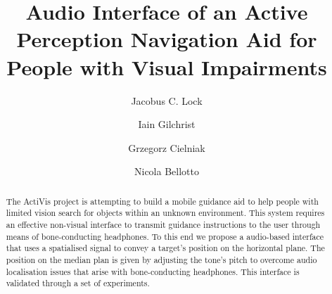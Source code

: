\documentclass{llncs}
\begin{document}
\title{Audio Interface of an Active Perception Navigation Aid for People with Visual Impairments}

\author{Jacobus C. Lock \and 
Iain Gilchrist \and
Grzegorz Cielniak \and
Nicola Bellotto}



\maketitle
\setcounter{footnote}{0}

\begin{abstract}
  The ActiVis project is attempting to build a mobile guidance aid to help people with limited vision search for objects within an unknown environment.
  This system requires an effective non-visual interface to transmit guidance instructions to the user through means of bone-conducting headphones.
  To this end we propose a audio-based interface that uses a spatialised signal to convey a target's position on the horizontal plane. 
  The position on the median plan is given by adjusting the tone's pitch to overcome audio localisation issues that arise with bone-conducting headphones. 
  This interface is validated through a set of experiments. 
\end{abstract} 
\end{document}

